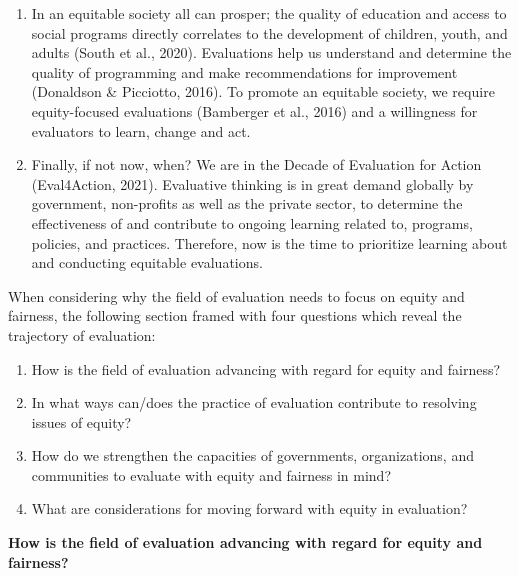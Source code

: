 \documentclass[
]{book}
\begin{document}
\begin{enumerate}
\def\labelenumi{\arabic{enumi}.}
\setcounter{enumi}{1}
\item
  In an equitable society all can prosper; the quality of education and access to social programs directly correlates to the development of children, youth, and adults (South et al., 2020). Evaluations help us understand and determine the quality of programming and make recommendations for improvement (Donaldson \& Picciotto, 2016). To promote an equitable society, we require equity-focused evaluations (Bamberger et al., 2016) and a willingness for evaluators to learn, change and act.
\item
  Finally, if not now, when? We are in the Decade of Evaluation for Action (Eval4Action, 2021). Evaluative thinking is in great demand globally by government, non-profits as well as the private sector, to determine the effectiveness of and contribute to ongoing learning related to, programs, policies, and practices. Therefore, now is the time to prioritize learning about and conducting equitable evaluations.
\end{enumerate}

When considering why the field of evaluation needs to focus on equity and fairness, the following section framed with four questions which reveal the trajectory of evaluation:

\begin{enumerate}
\def\labelenumi{\arabic{enumi}.}
\item
  How is the field of evaluation advancing with regard for equity and fairness?
\item
  In what ways can/does the practice of evaluation contribute to resolving issues of equity?
\item
  How do we strengthen the capacities of governments, organizations, and communities to evaluate with equity and fairness in mind?
\item
  What are considerations for moving forward with equity in evaluation?
\end{enumerate}

\textbf{How is the field of evaluation advancing with regard for equity and fairness?}
\end{document}
